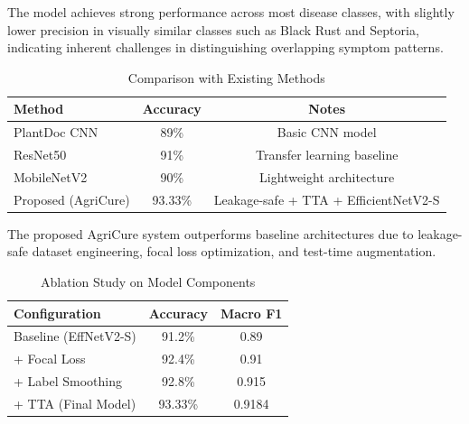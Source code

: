 \documentclass[conference]{IEEEtran}
\begin{document}
\begin{table}[t]
\centering
\caption{Per-Class Performance (Wheat Disease Detection)}
\label{tab:wheat-per-class}
\end{table}

The model achieves strong performance across most disease classes, with slightly lower precision in visually similar classes such as Black Rust and Septoria, indicating inherent challenges in distinguishing overlapping symptom patterns.

\begin{table}[t]
\centering
\caption{Comparison with Existing Methods}
\label{tab:comparison}
\begin{tabular}{lcc}
\hline
Method & Accuracy & Notes \\
\hline
PlantDoc CNN & 89\% & Basic CNN model \\
ResNet50 & 91\% & Transfer learning baseline \\
MobileNetV2 & 90\% & Lightweight architecture \\
Proposed (AgriCure) & 93.33\% & Leakage-safe + TTA + EfficientNetV2-S \\
\hline
\end{tabular}
\end{table}

The proposed AgriCure system outperforms baseline architectures due to leakage-safe dataset engineering, focal loss optimization, and test-time augmentation.

\begin{table}[t]
\centering
\caption{Ablation Study on Model Components}
\label{tab:ablation}
\begin{tabular}{lcc}
\hline
Configuration & Accuracy & Macro F1 \\
\hline
Baseline (EffNetV2-S) & 91.2\% & 0.89 \\
+ Focal Loss & 92.4\% & 0.91 \\
+ Label Smoothing & 92.8\% & 0.915 \\
+ TTA (Final Model) & 93.33\% & 0.9184 \\
\hline
\end{tabular}
\end{table}
\end{document}
